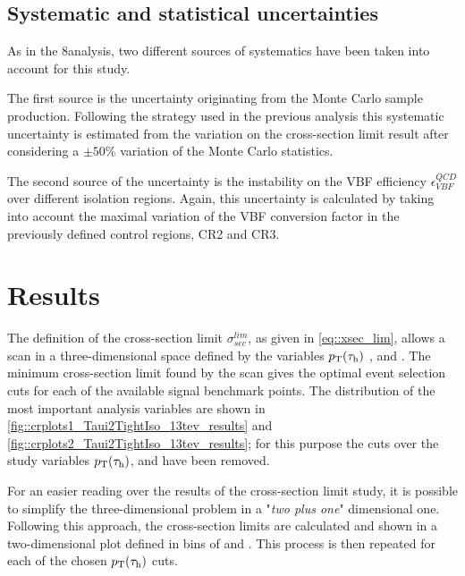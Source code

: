 \subsection{Systematic and statistical uncertainties}

As in the 8\tev analysis, two different sources of systematics have been taken into account for this study. 

The first source is the uncertainty originating from the Monte Carlo sample production. Following the strategy used in the previous analysis this systematic uncertainty is estimated from the variation on the cross-section limit result after considering a $\pm 50\%$ variation of the Monte Carlo statistics.

The second source of the uncertainty is the instability on the VBF efficiency $\epsilon^{QCD}_{VBF}$ over different \hadtau isolation regions. Again, this uncertainty is calculated by taking into account the maximal variation of the VBF conversion factor in the previously defined control regions, CR2 and CR3.

\section{Results}

The definition of the cross-section limit $\sigma^{lim}_{sec}$, as given in \autoref{eq::xsec_lim}, allows a scan in a three-dimensional space defined by the variables $p_{\text{T}}(\tau_{\text{h}})$ , \mjj and \met. The minimum cross-section limit found by the scan gives the optimal event selection cuts for each of the available signal benchmark points. The distribution of the most important analysis variables are shown in \autoref{fig::crplots1_Taui2TightIso_13tev_results} and \autoref{fig::crplots2_Taui2TightIso_13tev_results}; for this purpose the cuts over the study variables $p_{\text{T}}(\tau_{\text{h}})$, \mjj and \met have been removed. 

For an easier reading over the results of the cross-section limit study, it is possible to simplify the three-dimensional problem in a "\textit{two plus one}" dimensional one. Following this approach, the cross-section limits are calculated and shown in a two-dimensional plot defined in bins of \mjj and \met. This process is then repeated for each of the chosen $p_{\text{T}}(\tau_{\text{h}})$ cuts.

